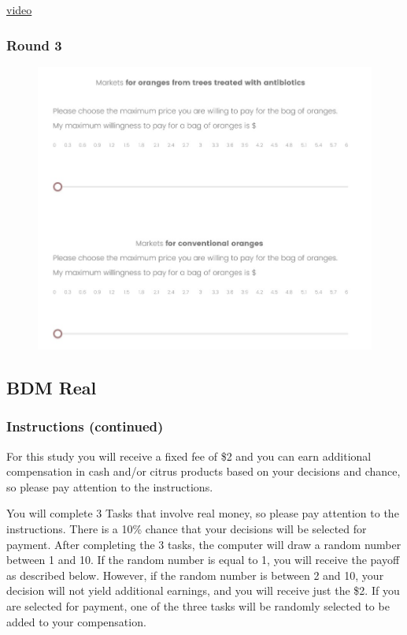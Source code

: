 \documentclass[12pt]{article}
\begin{document}
\href{https://www.youtube.com/watch?v=_AqMBjB0ChM}{video}
\clearpage


 \subsubsection*{\centering Round 3}


\begin{figure}[H]
    \centering
    \includegraphics[width=\linewidth]{BDM_market.jpg}
    \caption{}
    \label{fig:BDM_market}
\end{figure}

\clearpage



\subsection{BDM Real}


\subsubsection*{\textbf{Instructions (continued)}}


For this study you will receive a fixed fee of \$2 and you can earn additional compensation in cash and/or citrus products based on your decisions and chance, so please pay attention to the instructions.
 
You will complete 3 Tasks that involve real money, so please pay attention to the instructions. There is a 10\% chance that your decisions will be selected for payment. After completing the 3 tasks, the computer will draw a random number between 1 and 10. If the random number is equal to 1, you will receive the payoff as described below. However, if the random number is between 2 and 10, your decision will not yield additional earnings, and you will receive just the \$2. If you are selected for payment, one of the three tasks will be randomly selected to be added to your compensation.
\end{document}
